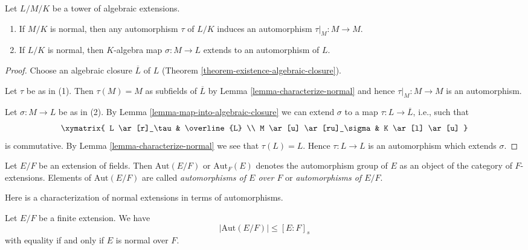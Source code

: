\begin{lemma}
\label{lemma-lift-maps}
Let $L/M/K$ be a tower of algebraic extensions.
\begin{enumerate}
\item If $M/K$ is normal, then any automorphism $\tau$ of $L/K$
induces an automorphism $\tau|_M : M \to M$.
\item If $L/K$ is normal, then $K$-algebra map $\sigma : M \to L$
extends to an automorphism of $L$.
\end{enumerate}
\end{lemma}

\begin{proof}
Choose an algebraic closure $\overline{L}$ of $L$
(Theorem \ref{theorem-existence-algebraic-closure}).

\medskip\noindent
Let $\tau$ be as in (1). Then $\tau(M) = M$ as subfields of $\overline{L}$
by Lemma \ref{lemma-characterize-normal} and hence
$\tau|_M : M \to M$ is an automorphism.

\medskip\noindent
Let $\sigma : M \to L$ be as in (2).
By Lemma \ref{lemma-map-into-algebraic-closure}
we can extend $\sigma$ to a map
$\tau : L \to \overline{L}$, i.e., such that
$$
\xymatrix{
L \ar[r]_\tau & \overline{L} \\
M \ar[u] \ar[ru]_\sigma & K \ar[l] \ar[u]
}
$$
is commutative. By Lemma \ref{lemma-characterize-normal} we see that
$\tau(L) = L$. Hence $\tau : L \to L$ is an automorphism which
extends $\sigma$.
\end{proof}

\begin{definition}
\label{definition-automorphisms}
Let $E/F$ be an extension of fields. Then $\text{Aut}(E/F)$ or
$\text{Aut}_F(E)$ denotes the automorphism group of $E$ as an object
of the category of $F$-extensions. Elements of $\text{Aut}(E/F)$
are called {\it automorphisms of $E$ over $F$} or
{\it automorphisms of $E/F$}.
\end{definition}

\noindent
Here is a characterization of normal extensions in terms of automorphisms.

\begin{lemma}
\label{lemma-normal-and-automorphisms}
Let $E/F$ be a finite extension. We have
$$
|\text{Aut}(E/F)| \leq [E : F]_s
$$
with equality if and only if $E$ is normal over $F$.
\end{lemma}

